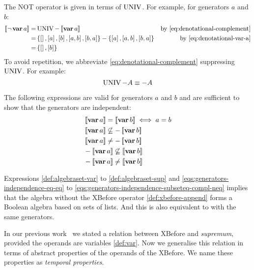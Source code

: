 The \ac{NOT} operator is given in terms of $\operatorname{UNIV}$.
For example, for generators $a$ and $b$:
\begin{align}
\denote{\lnot \var{a}} = & \UNIV - \denote{\var{a}} & \text{by \cref{eq:denotational-complement}}\nonumber\\
= & \left\{ \listsin{}, \listsin{a}, \listsin{b}, \listsin{a,b}, \listsin{b,a} \right\} - \left\{\listsin{a}, \listsin{a,b}, \listsin{b,a}\right\} & \text{by \cref{eq:denotational-var-a}} \nonumber\\
= & \left\{\listsin{}, \listsin{b}\right\}
\end{align}
To avoid repetition, we abbreviate \cref{eq:denotational-complement} suppressing $\operatorname{UNIV}$. 
For example:
\[
\operatorname{UNIV} - A \equiv -A
\]

The following expressions are valid for generators $a$ and $b$ and are sufficient to show that the generators are independent:
%
\begin{subequations}
\label{eqs:generators-independence}
\begin{align}
&\denote{\var{a}} = \denote{\var{b}} \iff a = b\label{eqs:generators-independence-eq-eq}\\
&\denote{\var{a}} \not\subseteq - \denote{\var{b}}\\
&\denote{\var{a}} \neq -\denote{\var{b}}\label{eqs:generators-independence-subseteq-neq-compl} \\
&- \denote{\var{a}} \not\subseteq \denote{\var{b}}\\
&- \denote{\var{a}} \neq \denote{\var{b}}\label{eqs:generators-independence-subseteq-compl-neq}
\end{align}
\end{subequations}

Expressions \cref{def:algebraset-var} to \cref{def:algebraset-sup} and \cref{eqs:generators-independence-eq-eq} to \cref{eqs:generators-independence-subseteq-compl-neq} implies that the \ac{algebra} without the \ac{XBefore} operator \cref{def:xbefore-append} forms a Boolean algebra based on sets of lists.
And this is also equivalent to  with the same generators.

In our previous work~\cite{DM2015} we stated a relation between \ac{XBefore} and \emph{supremum}, provided the operands are variables \cref{def:var}.
Now we generalise this relation in terms of abstract properties of the operands of the \ac{XBefore}.
We name these properties as \emph{temporal properties}.

